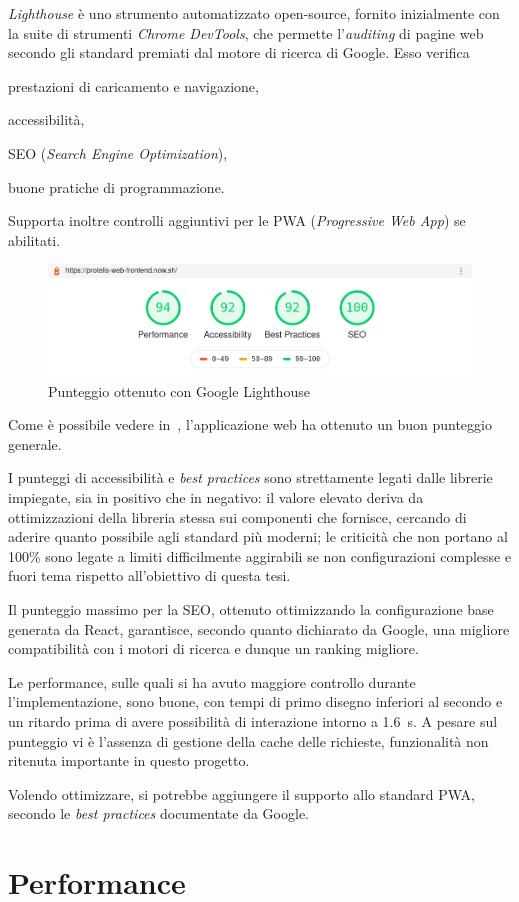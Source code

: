     \emph{Lighthouse} è uno strumento automatizzato open-source, fornito inizialmente con la suite di strumenti \emph{Chrome DevTools}, che permette l'\emph{auditing} di pagine web secondo gli standard premiati dal motore di ricerca di Google.
    Esso verifica
    \begin{inparaitem}
      \item prestazioni di caricamento e navigazione,
      \item accessibilità,
      \item SEO (\emph{\emph{S}earch \emph{E}ngine \emph{O}ptimization}),
      \item buone pratiche di programmazione.
    \end{inparaitem}
    Supporta inoltre controlli aggiuntivi per le PWA (\emph{\emph{P}rogressive \emph{W}eb \emph{A}pp}) se abilitati.

    \begin{figure}
      \centering
      \includegraphics[width=\textwidth]{res/tests/Screenshot_2020-03-04 Lighthouse Report Viewer.png}%
      \caption{Punteggio ottenuto con Google Lighthouse}%
      \label{fig:lighthouse}
    \end{figure}

    Come è possibile vedere in~, l'applicazione web ha ottenuto un buon punteggio generale.

    I punteggi di accessibilità e \emph{best practices} sono strettamente legati dalle librerie impiegate, sia in positivo che in negativo:
    il valore elevato deriva da ottimizzazioni della libreria stessa sui componenti che fornisce, cercando di aderire quanto possibile agli standard più moderni;
    le criticità che non portano al 100\% sono legate a limiti difficilmente aggirabili se non configurazioni complesse e fuori tema rispetto all'obiettivo di questa tesi.

    Il punteggio massimo per la SEO, ottenuto ottimizzando la configurazione base generata da React, garantisce, secondo quanto dichiarato da Google, una migliore compatibilità con i motori di ricerca e dunque un ranking migliore.

    Le performance, sulle quali si ha avuto maggiore controllo durante l'implementazione, sono buone, con tempi di primo disegno inferiori al secondo e un ritardo prima di avere possibilità di interazione intorno a \SI{1.6}{\second}.
    A pesare sul punteggio vi è l'assenza di gestione della cache delle richieste, funzionalità non ritenuta importante in questo progetto.

    Volendo ottimizzare, si potrebbe aggiungere il supporto allo standard PWA, secondo le \emph{best practices} documentate da Google.

  \section{Performance}
